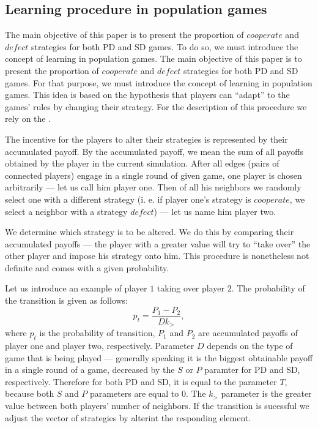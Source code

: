 \documentclass[english, twoside, 12pt, a4paper]{article}
\theoremstyle{definition}
\theoremstyle{plain}
\theoremstyle{remark}
\begin{document}
\subsection{Learning procedure in population games}

The main objective of this paper is to present the proportion of $cooperate$ and $defect$ strategies for both PD and SD games. To do so, we must introduce the concept of learning in population games. The main objective of this paper is to present the proportion of $cooperate$ and $defect$ strategies for both PD and SD games.  For that purpose, we must introduce the concept of learning in population games. This idea is based on the hypothesis that players can \enquote{adapt} to the games' rules by changing their strategy. For the description of this procedure we rely on the \cite{santos2005scale}. 

The incentive for the players to alter their strategies is represented by their accumulated payoff. By the accumulated payoff, we mean the sum of all payoffs obtained by the player in the current simulation. 
After all edges (pairs of connected players) engage in a single round of given game, one player is chosen arbitrarily --- let us call him player one. Then of all his neighbors we randomly select one with a different strategy (i. e. if player one's strategy is $cooperate$, we select a neighbor with a strategy $defect$) --- let us name him player two.

We determine which strategy is to be altered. We do this by comparing their accumulated payoffs --- the player with a greater value will try to \enquote{take over} the other player and impose his strategy onto him. This procedure is nonetheless not definite and comes with a given probability. 

Let us introduce an example of player $1$ taking over player $2$. The probability of the transition is given as follows:
\[
  p_t = \frac{P_1-P_2}{Dk_>},
\]
where $p_t$ is the probability of transition, $P_1$ and $P_2$ are accumulated payoffs of player one and player two, respectively. Parameter $D$ depends on the type of game that is being played --- generally speaking it is the biggest obtainable payoff in a single round of a game, decreased by the $S$ or $P$ paramter for PD and SD, respectively. Therefore for both PD and SD, it is equal to the parameter $T$, because both $S$ and $P$ parameters are equal to $0$. The $k_>$ parameter is the greater value between both players' number of neighbors.
If the transition is sucessful we adjust the vector of strategies by alterint the responding element. 
\clearpage
\end{document}
